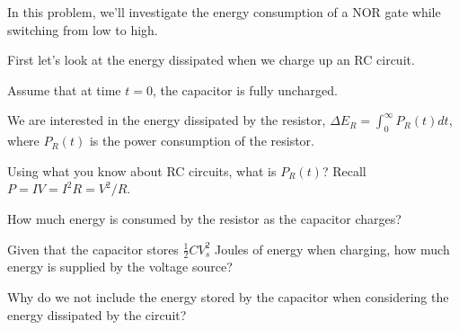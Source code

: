 
In this problem, we'll investigate the energy consumption of a NOR gate while switching from low to high.

First let's look at the energy dissipated when we charge up an RC circuit.



Assume that at time $t = 0$, the capacitor is fully uncharged.

\begin{enumerate}

\qitem We are interested in the energy dissipated by the resistor, $\Delta E_R = \int_0^\infty P_R(t) dt$, where $P_R(t)$ is the power consumption of the resistor.

Using what you know about RC circuits, what is $P_R(t)$? Recall $P = IV = I^2R = V^2 / R$.




\qitem How much energy is consumed by the resistor as the capacitor charges?



\qitem Given that the capacitor stores $\frac{1}{2}CV_s^2$ Joules of energy when charging, how much energy is supplied by the voltage source?

Why do we not include the energy stored by the capacitor when considering the energy dissipated by the circuit?

\end{enumerate}

